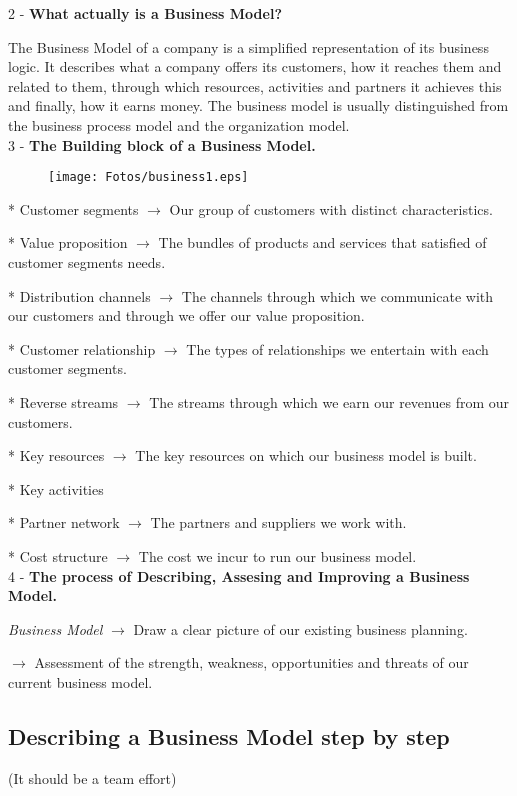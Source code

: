 \documentclass[11pt,a4paper]{article}
\begin{document}
2 - \textbf{What actually is a Business Model?}

The Business Model of a company is a simplified representation of its business logic. It describes what a company offers its customers, how it reaches them and related to them, through which resources, activities and partners it achieves this and finally, how it earns money. The business model is usually distinguished from the business process model and the organization model.\\

3 - \textbf{The Building block of a Business Model.}
\begin{figure}[hbtp]
\begin{center}
\texttt{[image: Fotos/business1.eps]}
\end{center}
\end{figure}

* Customer segments $\to$ Our group of customers with distinct characteristics.

* Value proposition $\to$ The bundles of products and services that satisfied of customer segments needs.

* Distribution channels $\to$ The channels through which we communicate with our customers and through we offer our value proposition.

* Customer relationship $\to$ The types of relationships we entertain with each customer segments.

* Reverse streams $\to$ The streams through which we earn our revenues from our customers.

* Key resources $\to$ The key resources on which our business model is built.

* Key activities

* Partner network $\to$ The partners and suppliers we work with.

* Cost structure $\to$ The cost we incur to run our business model.\\

4 - \textbf{The process of Describing, Assesing and Improving a Business Model.}

\emph{Business Model} $\to$ Draw a clear picture of our existing business planning.

\hspace{2.7cm} $\to$ Assessment of the strength, weakness, opportunities and threats of our current business model.

\subsection{Describing a Business Model step by step}
(It should be a team effort)
\end{document}
